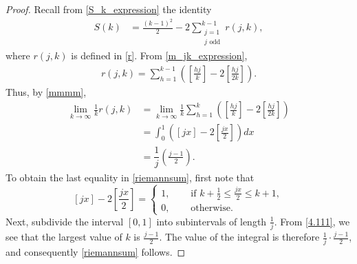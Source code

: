 \documentclass[10pt,a4paper]{amsart}
\newcommand{\df}{\dfrac}
\begin{document}
\begin{proof} Recall from \eqref{S_k_expression} the identity
\begin{align}\label{4.22}
	S(k)
	&=\frac{(k-1)^2}{2}-2\sum_{\substack{j=1\\j \text{ odd}}}^{k-1}r(j,k),
\end{align}
where  $r(j,k)$ is defined in \eqref{r}. From \eqref{m_jk_expression},
    \begin{align}\label{mmmm}
r(j,k)= \sum_{h=1}^{k-1} \left(\left[\frac{hj}{k}\right]-2\left[\frac{hj}{2k}\right]\right).
\end{align}
Thus, by \eqref{mmmm},
\begin{align}
 \lim_{k\to\infty}\frac{1}{k} r(j,k)&=\lim_{k\to\infty} \frac{1}{k}\sum_{h=1}^{k} \left(\left[\frac{hj}{k}\right]-2\left[\frac{hj}{2k}\right]\right)\nonumber\\
    &=\int _0^1\left(\left[ jx\right]-2\left[\frac{jx}{2}\right]\right)dx\nonumber\\
    &=\df{1}{j}\left(\frac{j-1}{2}\right).\label{riemannsum}
\end{align}
To obtain the last equality in \eqref{riemannsum}, first note that
\begin{equation}\label{4.111}
\left[ jx\right]-2\left[\frac{jx}{2}\right]
=\begin{cases} 1,\quad &\text{ if } k+\frac{1}{2} \leq \frac{jx}{2} \leq k+1,  \\
0,&\text{ otherwise}.
\end{cases}
\end{equation}
 Next, subdivide the interval $[0,1] $ into subintervals of length $\frac{1}{j}$. From \eqref{4.111}, we see that the largest value of $k$ is $\frac{j-1}{2}$. The value of the integral is therefore $\frac{1}{j}\cdot\frac{j-1}{2}$, and consequently \eqref{riemannsum} follows.


\end{proof}
\end{document}
